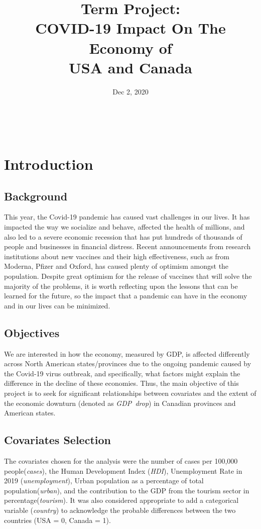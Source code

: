 \documentclass{article}
\begin{document}
\title{\textbf{Term Project:\protect\\ COVID-19 Impact On The Economy of\protect\\ USA and Canada}}\\

\date{Dec 2, 2020}

\maketitle
\newpage
\section{Introduction}
\subsection{Background}
This year, the Covid-19 pandemic has caused vast challenges in our lives. It has impacted the way we socialize and behave, affected the health of millions, and also led to a severe economic recession that has put hundreds of thousands of people and businesses in financial distress. Recent announcements from research institutions about new vaccines and their high effectiveness, such as from Moderna, Pfizer and Oxford, has caused plenty of optimism amongst the population. Despite great optimism for the release of vaccines that will solve the majority of the problems, it is worth reflecting upon the lessons that can be learned for the future, so the impact that a pandemic can have in the economy and in our lives can be minimized. \\

\subsection{Objectives}

We are interested in how the economy, measured by GDP, is affected differently across North American states/provinces due to the ongoing pandemic caused by the Covid-19 virus outbreak, and specifically, what factors might explain the difference in the decline of these economies. Thus, the main objective of this project is to seek for significant relationships between covariates and the extent of the economic downturn (denoted as \textit{GDP~drop}) in Canadian provinces and American states.\\

\subsection{Covariates Selection}
The covariates chosen for the analysis were the number of cases per 100,000 people(\textit{cases}), the Human Development Index (\textit{HDI}), Unemployment Rate in 2019 (\textit{unemployment}), Urban population as a percentage of total population(\textit{urban}), and the contribution to the GDP from the tourism sector in percentage(\textit{tourism}). It was also considered appropriate to add a categorical variable (\textit{country}) to acknowledge the probable differences between the two countries (USA = 0, Canada = 1).
\end{document}
